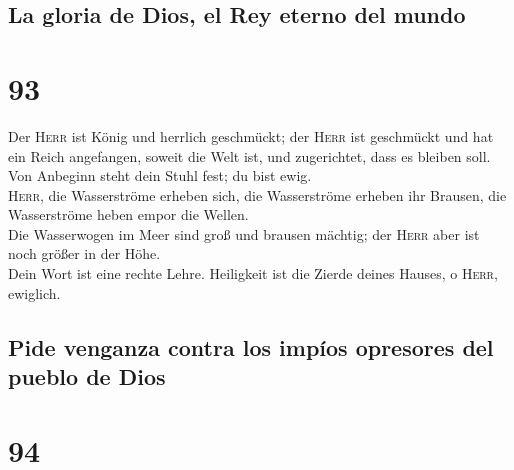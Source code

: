 \hypertarget{la-gloria-de-dios-el-rey-eterno-del-mundo}{%
\subsection{La gloria de Dios, el Rey eterno del
mundo}\label{la-gloria-de-dios-el-rey-eterno-del-mundo}}

\hypertarget{section-92}{%
\section{93}\label{section-92}}

 Der \textsc{Herr} ist König und herrlich geschmückt; der
\textsc{Herr} ist geschmückt und hat ein Reich angefangen, soweit die
Welt ist, und zugerichtet, dass es bleiben soll.\\
 Von Anbeginn steht dein Stuhl fest; du bist ewig.\\
 \textsc{Herr}, die Wasserströme erheben sich, die
Wasserströme erheben ihr Brausen, die Wasserströme heben empor die
Wellen.\\
 Die Wasserwogen im Meer sind groß und brausen mächtig;
der \textsc{Herr} aber ist noch größer in der Höhe.\\
 Dein Wort ist eine rechte Lehre. Heiligkeit ist die
Zierde deines Hauses, o \textsc{Herr}, ewiglich.

\hypertarget{pide-venganza-contra-los-impuxedos-opresores-del-pueblo-de-dios}{%
\subsection{Pide venganza contra los impíos opresores del pueblo de
Dios}\label{pide-venganza-contra-los-impuxedos-opresores-del-pueblo-de-dios}}

\hypertarget{section-93}{%
\section{94}\label{section-93}}

